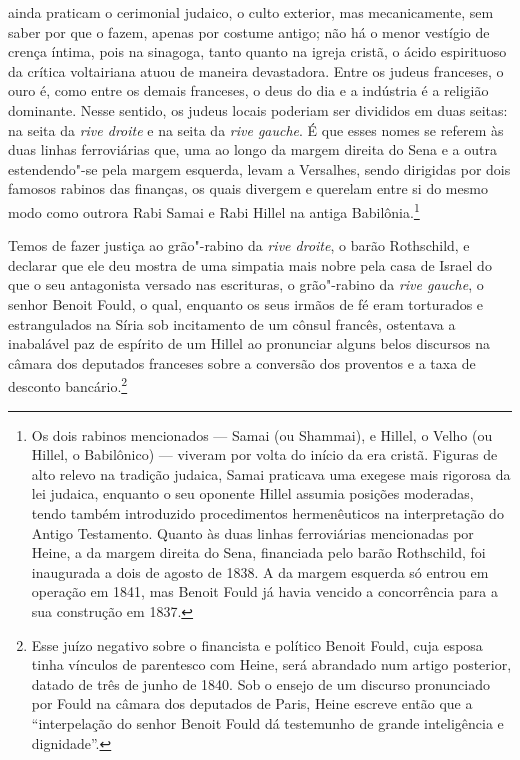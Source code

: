 ainda praticam o cerimonial judaico, o culto exterior, mas
mecanicamente, sem saber por que o fazem, apenas por costume antigo;
não há o menor vestígio de crença íntima, pois na sinagoga, tanto
quanto na igreja cristã, o ácido espirituoso da crítica voltairiana
atuou de maneira devastadora. Entre os judeus franceses, o ouro é, como
entre os demais franceses, o deus do dia e a indústria é a religião
dominante. Nesse sentido, os judeus locais poderiam ser divididos em
duas seitas: na seita da \textit{rive droite} e na seita da
\textit{rive gauche}. É que esses nomes se referem às duas linhas
ferroviárias que, uma ao longo da margem direita do Sena e a outra
estendendo"-se pela margem esquerda, levam a Versalhes, sendo
dirigidas por dois famosos rabinos das finanças, os quais divergem e
querelam entre si do mesmo modo como outrora Rabi Samai e Rabi Hillel
na antiga Babilônia.\footnote{ Os dois rabinos mencionados --- Samai (ou
Shammai), e Hillel, o Velho (ou Hillel, o Babilônico) --- viveram por
volta do início da era cristã. Figuras de alto relevo na tradição
judaica, Samai praticava uma exegese mais rigorosa da lei judaica,
enquanto o seu oponente Hillel assumia posições moderadas, tendo também
introduzido procedimentos hermenêuticos na interpretação do Antigo
Testamento. Quanto às duas linhas ferroviárias mencionadas por
Heine, a da margem direita do Sena, financiada pelo barão Rothschild,
foi inaugurada a dois de agosto de 1838. A da margem esquerda só entrou
em operação em 1841, mas Benoit Fould já havia vencido a concorrência
para a sua construção em 1837.}

 Temos de fazer justiça ao grão"-rabino da \textit{rive droite}, o
barão Rothschild, e declarar que ele deu mostra de uma simpatia mais
nobre pela casa de Israel do que o seu antagonista versado nas
escrituras, o grão"-rabino da \textit{rive gauche}, o senhor Benoit
Fould, o qual, enquanto os seus irmãos de fé eram torturados e
estrangulados na Síria sob incitamento de um cônsul francês, ostentava
a inabalável paz de espírito de um Hillel ao pronunciar alguns belos
discursos na câmara dos deputados franceses sobre a conversão dos
proventos e a taxa de desconto bancário.\footnote{ Esse juízo negativo
sobre o financista e político Benoit Fould, cuja esposa tinha vínculos
de parentesco com Heine, será abrandado num artigo posterior, datado de
três de junho de 1840. Sob o ensejo de um discurso pronunciado por
Fould na câmara dos deputados de Paris, Heine escreve então que a
“interpelação do senhor Benoit Fould dá testemunho de grande
inteligência e dignidade”.}

